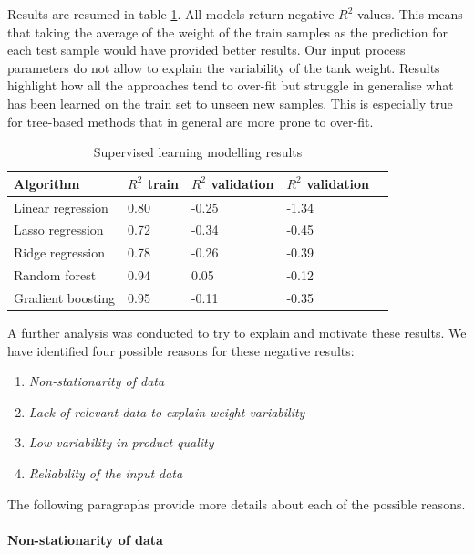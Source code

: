 Results are resumed in table \ref{tab:modelling_results}. All models return negative $R^2$ values. This means that taking the average of the weight of the train samples as the prediction for each test sample would have provided better results. Our input process parameters do not allow to explain the variability of the tank weight. Results highlight how all the approaches tend to over-fit but struggle in generalise what has been learned on the train set to unseen new samples. This is especially true for tree-based methods that in general are more prone to over-fit. 

\begin{table}
\centering
\caption{Supervised learning modelling results}
\label{tab:modelling_results}
\begin{tabular}{lllll}
\toprule
\textbf{Algorithm} & \textbf{$R^2$ train} & \textbf{$R^2$ validation} & \textbf{$R^2$ validation} \\
\midrule
Linear regression   & 0.80   & -0.25 & -1.34  \\ 
Lasso regression    & 0.72   & -0.34 & -0.45  \\ 
Ridge regression    & 0.78   & -0.26 & -0.39 \\ 
Random forest       & 0.94   &  0.05 & -0.12    \\ 
Gradient boosting   & 0.95   & -0.11 & -0.35  \\ 
\bottomrule
\end{tabular}
\end{table}
%
A further analysis was conducted to try to explain and motivate these results. We have identified four possible reasons for these negative results:
%
\begin{enumerate}
    \item \textit{Non-stationarity of data}
    \item \textit{Lack of relevant data to explain weight variability}
    \item \textit{Low variability in product quality}
    \item \textit{Reliability of the input data}
\end{enumerate}
%
The following paragraphs provide more details about each of the possible reasons. 

\paragraph{Non-stationarity of data}

